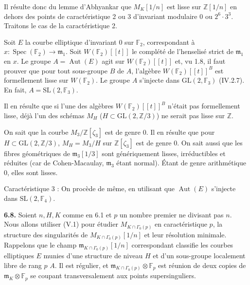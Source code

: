 \documentclass[10pt,a4paper]{amsart}
\theoremstyle{plain}
\theoremstyle{definition}
\DeclareMathOperator{\Spec}{Spec}
\DeclareMathOperator{\Aut}{Aut}
\newcommand{\m}{\mathfrak{m}}
\newcommand{\FF}{\mathbb{F}}
\newcommand{\ZZ}{\mathbb{Z}}
\newcommand{\GL}{\mathrm{GL}}
\newcommand{\SL}{\mathrm{SL}}
\begin{document}
Il r\'esulte donc du lemme d'Abhyankar que $M_K[1/n]$ est lisse sur $\ZZ[1/n]$ en dehors des points de caract\'eristique 2 ou 3 d'invariant modulaire $0$ ou $2^6 \cdot 3^3$. Traitons le cas de la caract\'eristique 2.

Soit $E$ la courbe elliptique d'invariant $0$ sur $\FF_2$, correspondant \`a $x : \Spec(\FF_2) \to \m_1$. Soit $W(\FF_2)[[t]]$ le compl\'et\'e de l'henselis\'e strict de $\m_1$ en $x$. Le groupe $A = \Aut(E)$ agit sur $W(\FF_2)[[t]]$ et, vu 1.8, il faut prouver que pour tout sous-groupe $B$ de $A$, l'alg\`ebre $W(\FF_2)[[t]]^B$ est formellement lisse sur $W(\FF_2)$. Le groupe $A$ s'injecte dans $\GL(2,\FF_3)$ (IV.2.7). En fait, $A = \SL(2,\FF_3)$.

Il en r\'esulte que si l'une des alg\`ebres $W(\FF_2)[[t]]^B$ n'\'etait pas formellement lisse, d\'ej\`a l'un des sch\'emas $M_H$ ($H \subset \GL(2,\ZZ/3)$) ne serait pas lisse sur $\ZZ$.

On sait que la courbe $M_3 / \ZZ[\zeta_3]$ est de genre 0. Il en r\'esulte que pour $H \subset \GL(2,\ZZ/3)$, $M_H = M_3/H$ sur $\ZZ[\zeta_3]$ est de genre 0. On sait aussi que les fibres g\'eom\'etriques de $\m_3[1/3]$ sont g\'en\'eriquement lisses, irr\'eductibles et r\'eduites (car de Cohen-Macaulay, $\m_3$ \'etant normal). \'Etant de genre arithm\'etique 0, elles sont lisses.

Caract\'eristique 3 : On proc\`ede de m\^eme, en utilisant que $\Aut(E)$ s'injecte dans $\SL(2,\FF_4)$.

\medskip\noindent\textbf{6.8.} Soient $n, H, K$ comme en 6.1 et $p$ un nombre premier ne divisant pas $n$. Nous allons utiliser (V.1) pour \'etudier $M_{K \cap \Gamma_0(p)}$ en caract\'eristique $p$, la structure des singularit\'es de $M_{K \cap \Gamma_0(p)}[1/n]$ et leur r\'esolution minimale. Rappelons que le champ $\m_{K \cap \Gamma_0(p)}[1/n]$ correspondant classifie les courbes elliptiques $E$ munies d'une structure de niveau $H$ et d'un sous-groupe localement libre de rang $p$ $A$. Il est r\'egulier, et $\m_{K \cap \Gamma_0(p)} \otimes \FF_p$ est r\'eunion de deux copies de $\m_K \otimes \FF_p$ se coupant transversalement aux points supersinguliers.
\end{document}
